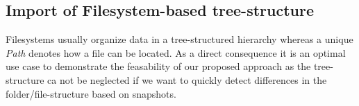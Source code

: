 




\subsection{Import of Filesystem-based tree-structure}
Filesystems usually organize data in a tree-structured hierarchy whereas a unique \emph{Path} denotes how a file can be located. As a direct consequence it is an optimal use case to demonstrate the feasability of our proposed approach as the tree-structure ca not be neglected if we want to quickly detect differences in the folder/file-structure based on snapshots.

